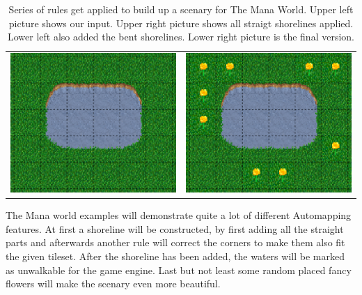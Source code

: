 \begin{table}
\begin{tabular}{c c}
	    \includegraphics[scale=1]{Example/TheManaWorld/flow3.eps} &
	    \includegraphics[scale=1]{Example/TheManaWorld/flow4.eps} \\
		\end{tabular}
  \caption{Series of rules get applied to build up a scenary for The Mana World. Upper left picture shows our input.
  Upper right picture shows all straigt shorelines applied. Lower left also added the bent shorelines. Lower right picture is the final version.}
\end{table}

The Mana world examples will demonstrate quite a lot of different Automapping
features. At first a shoreline will be constructed, by first adding all
the straight parts and afterwards another rule will correct the corners
to make them also fit the given tileset. After the shoreline has been added,
the waters will be marked as unwalkable for the game engine. Last but not least
some random placed fancy flowers will make the scenary even more beautiful.




